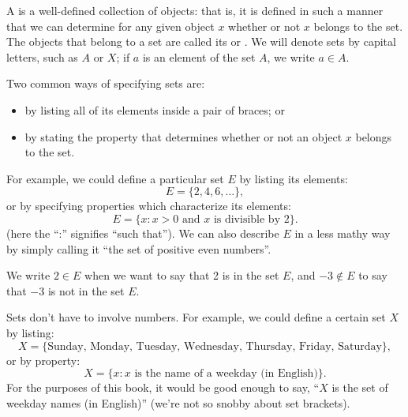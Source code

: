 \begin{defn} A  is a well-defined collection of objects: that is, it is defined in such a manner that we can determine for any given object $x$ whether or not $x$ belongs to the set.  The objects that belong to a set are called its  or . We will denote sets by capital letters, such as $A$ or $X$; if $a$ is an element of the set $A$, we write $a \in A$\label{sets_membership}.
\end{defn}
Two common ways of specifying sets are:
\begin{itemize}
\item
by listing all of its elements inside a pair of braces; or 
\item
by stating the property that determines whether or not an object $x$ belongs to the set. 
\end{itemize}
For example, we could define a particular set $E$ by listing its elements: 
\[
E = \{2, 4, 6, \ldots \}, \]
or by specifying properties which characterize its elements:
\[ E = \{ x :  x > 0  \textrm{ and } x \textrm{ is divisible by 2}\}.
\]
(here the ``:'' signifies ``such that'').  
We can also describe $E$  in a less mathy way by simply calling it ``the set of positive even numbers''.

We write $2 \in E$ when we want to say that 2 is in the set $E$, and $-3 \notin E$ to say that $-3$ is not in the set $E$.

Sets don't have to involve numbers. For example, we could define a certain set $X$ by listing:
\[
X = \{\textrm{Sunday, Monday, Tuesday, Wednesday, Thursday, Friday, Saturday} \},
\]
or by property:
\[
X = \{ x :x \text{ is the name of a weekday (in English)}\}.
\]
For the purposes of this book, it would be good enough to say, ``$X$ is the set of weekday names (in English)'' (we're not so snobby about set brackets).



